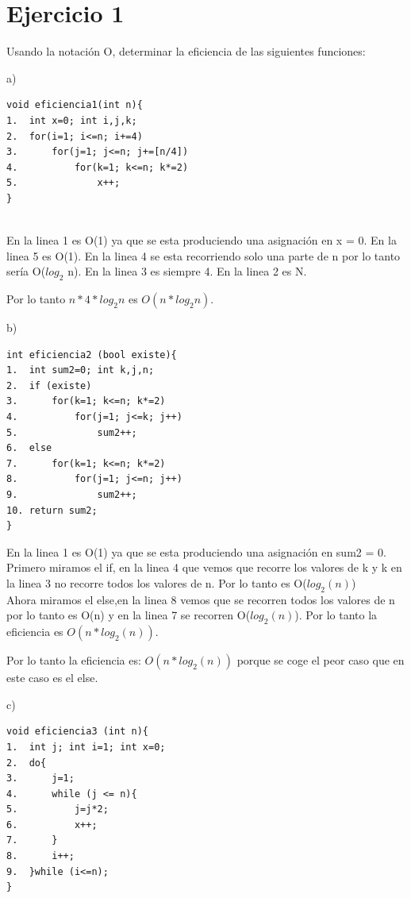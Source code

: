 \documentclass[12pt, spanish]{article}
\begin{document}
\pagebreak
\tableofcontents
\pagebreak

\section{Ejercicio 1}

Usando la notación O, determinar la eficiencia de las siguientes funciones: 

a)

\begin{lstlisting}
void eficiencia1(int n){
1.	int x=0; int i,j,k;
2.	for(i=1; i<=n; i+=4)
3.		for(j=1; j<=n; j+=[n/4])
4.			for(k=1; k<=n; k*=2)
5.				x++;
}


\end{lstlisting}

En la linea 1 es O(1) ya que se esta produciendo una asignación en x = 0.
En la linea 5 es O(1). 
En la linea 4 se esta recorriendo solo una parte de n por lo tanto sería O($log_2$ n).
En la linea 3 es siempre 4.
En la linea 2 es N.

Por lo tanto $n* 4 * log_2 n$ es $O(n * log_2 n)$.


b)

\begin{lstlisting}
int eficiencia2 (bool existe){
1.	int sum2=0; int k,j,n;
2.	if (existe)
3.		for(k=1; k<=n; k*=2)
4.			for(j=1; j<=k; j++)
5.				sum2++;
6.	else
7.		for(k=1; k<=n; k*=2)
8.			for(j=1; j<=n; j++)
9.				sum2++;
10.	return sum2;
}

\end{lstlisting}

En la linea 1 es O(1) ya que se esta produciendo una asignación en sum2 = 0. \\
Primero miramos el if,  en la linea 4 que vemos que recorre los valores de k y k en la linea 3 no recorre todos los valores de n. Por lo tanto es O($log_2(n)$)\\
Ahora miramos el else,en la linea 8 vemos que se recorren todos los valores de n por lo tanto es O(n) y en la linea 7 se recorren O($log_2(n)$). Por lo tanto la eficiencia es $O(n * log_2(n))$.

Por lo tanto la eficiencia es: $O(n * log_2(n))$ porque se coge el peor caso que en este caso es el else.

\pagebreak

c)

\begin{lstlisting}
void eficiencia3 (int n){
1.	int j; int i=1; int x=0;
2.	do{
3.		j=1;
4.		while (j <= n){
5.			j=j*2;
6.			x++;
7.		}
8.		i++;
9.	}while (i<=n);
}

\end{lstlisting}
\end{document}

